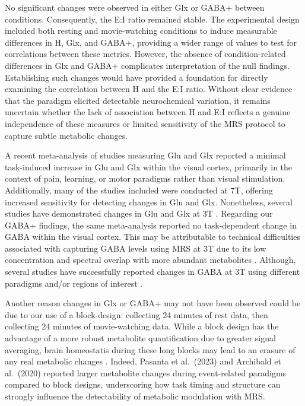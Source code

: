 \documentclass[
true
]{sn-jnl}
\begin{document}
No significant changes were observed in either Glx or GABA+ between
conditions. Consequently, the E:I ratio remained stable. The
experimental design included both resting and movie-watching conditions
to induce measurable differences in H, Glx, and GABA+, providing a wider
range of values to test for correlations between these metrics. However,
the absence of condition-related differences in Glx and GABA+
complicates interpretation of the null findings. Establishing such
changes would have provided a foundation for directly examining the
correlation between H and the E:I ratio. Without clear evidence that the
paradigm elicited detectable neurochemical variation, it remains
uncertain whether the lack of association between H and E:I reflects a
genuine independence of these measures or limited sensitivity of the MRS
protocol to capture subtle metabolic changes.

A recent meta-analysis of studies measuring Glu and Glx
\citep{pasantaFunctionalMRSStudies2023} reported a minimal task-induced
increase in Glu and Glx within the visual cortex, primarily in the
context of pain, learning, or motor paradigms rather than visual
stimulation. Additionally, many of the studies included were conducted
at 7T, offering increased sensitivity for detecting changes in Glu and
Glx. Nonetheless, several studies have demonstrated changes in Glu and
Glx at 3T
\citep{gutzeitDifferentialNMRSpectroscopy2013, cleveAssessmentIntraInterregional2017, apsvalkaEventrelatedDynamicsGlutamate2015}.
Regarding our GABA+ findings, the same meta-analysis
\citep{pasantaFunctionalMRSStudies2023} reported no task-dependent
change in GABA within the visual cortex. This may be attributable to
technical difficulties associated with capturing GABA levels using MRS
at 3T due to its low concentration and spectral overlap with more
abundant metabolites \citep{pasantaFunctionalMRSStudies2023}. Although,
several studies have successfully reported changes in GABA at 3T using
different paradigms and/or regions of interest
\citep{floyer-leaRapidModulationGABA2006, sampaio-baptistaChangesFunctionalConnectivity2015, staggRoleGABAHuman2011}.

Another reason changes in Glx or GABA+ may not have been observed could
be due to our use of a block-design: collecting 24 minutes of rest data,
then collecting 24 minutes of movie-watching data. While a block design
has the advantage of a more robust metabolite quantification due to
greater signal averaging, brain homeostatis during these long blocks may
lead to an erasure of any real metabolic changes
\citep{mangiaMetabolicPathwaysActivitydependent2012, apsvalkaEventrelatedDynamicsGlutamate2015}.
Indeed, Pasanta et al.~(2023) \citep{pasantaFunctionalMRSStudies2023}
and Archibald et al.~(2020)
\citep{archibaldMetaboliteActivityAnterior2020} reported larger
metabolite changes during event-related paradigms compared to block
designs, underscoring how task timing and structure can strongly
influence the detectability of metabolic modulation with MRS.
\end{document}
